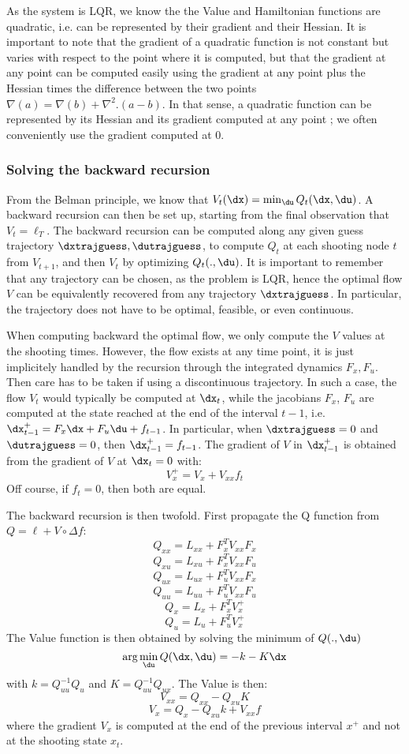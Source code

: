 \documentclass[10pt,a4paper]{article}
\begin{document}
As the system is LQR, we know the the Value and Hamiltonian functions are quadratic, i.e. can be represented by their gradient and their Hessian.
It is important to note that the gradient of a quadratic function is not constant but varies with respect to the point where it is computed, but that the gradient at any point can be computed easily using the gradient at any point plus the Hessian times the difference between the two points $\nabla (a) = \nabla(b) + \nabla^2.(a-b)$. In that sense, a quadratic function can be represented by its Hessian and its gradient computed at any point ; we often conveniently use the gradient computed at 0.

\subsubsection{Solving the backward recursion}
From the Belman principle, we know that $V_t(\dx) = \min_{\du} Q_t(\dx,\du)$.
A backward recursion can then be set up, starting from the final observation that $V_t = \ell_T$.
The backward recursion can be computed along any given guess trajectory $\dxtrajguess, \dutrajguess$, to compute $Q_t$ at each shooting node $t$ from $V_{t+1}$, and then $V_t$ by optimizing $Q_t(.,\du)$.
It is important to remember that any trajectory can be chosen, as the problem is LQR, hence the optimal flow $V$ can  be equivalently recovered from any trajectory $\dxtrajguess$.
In particular, the trajectory does not have to be optimal, feasible, or even continuous.

When computing backward the optimal flow, we only compute the $V$ values at the shooting times.
However, the flow exists at any time point, it is just implicitely handled by the recursion through the integrated dynamics $F_x,F_u$.
Then care has to be taken if using a discontinuous trajectory.
In such a case, the flow $V_t$ would typically be computed at $\dx_t$, while the jacobians $F_x$, $F_u$ are computed at the state reached at the end of the interval $t-1$, i.e. $\dx_{t-1}^+ = F_x \dx + F_u \du + f_{t-1}$.
In particular, when $\dxtrajguess =0$ and $\dutrajguess=0$, then $\dx_{t-1}^+ = f_{t-1}$.
The gradient of $V$ in $\dx_{t-1}^+$ is obtained from the gradient of $V$ at $\dx_t=0$ with:
$$V_x^+ = V_x + V_{xx} f_t$$
Off course, if $f_t=0$, then both are equal.

The backward recursion is then twofold. First propagate the Q function from $Q=\ell+V\circ \Delta f$:
$$Q_{xx} = L_{xx} + F_x^T V_{xx} F_x$$
$$Q_{xu} = L_{xu} + F_x^T V_{xx} F_u$$
$$Q_{ux} = L_{ux} + F_u^T V_{xx} F_x$$
$$Q_{uu} = L_{uu} + F_u^T V_{xx} F_u$$
$$Q_{x}  = L_x + F_x^T V_x^+$$
$$Q_{u}  = L_u + F_u^T V_x^+$$
The Value function is then obtained by solving the minimum of $Q(.,\du)$
$$\text{arg}\min_{\du} Q(\dx,\du) = -k - K \dx$$
with $k=Q_{uu}^{-1} Q_u$ and $K = Q_{uu}^{-1} Q_{ux}$. The Value is then:
$$V_{xx} = Q_{xx} - Q_{xu} K$$
$$V_x = Q_x - Q_{xu} k + V_{xx} f$$
where the gradient $V_x$ is computed at the end of the previous interval $x^+$ and not at the shooting state $x_t$.
\end{document}

